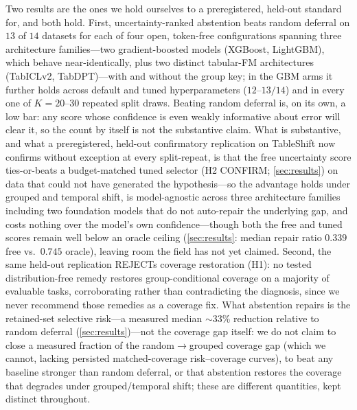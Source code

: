 \documentclass[11pt]{article}
\begin{document}
Two results are the ones we hold ourselves to a preregistered, held-out standard for, and both hold. First,
uncertainty-ranked abstention beats random deferral on $13$ of $14$ datasets for each of four open,
token-free configurations spanning three architecture families---two gradient-boosted models (XGBoost,
LightGBM), which behave near-identically, plus two distinct tabular-FM
architectures (TabICLv2, TabDPT)---with and without the group key; in the GBM arms it further holds across
default and tuned hyperparameters ($12$--$13/14$) and in every one of $K{=}20$--$30$ repeated split draws.
Beating random deferral is, on its own, a low bar: any score whose confidence is even weakly informative
about error will clear it, so the count by itself is not the substantive claim. What is substantive, and
what a preregistered, held-out confirmatory replication on TableShift now confirms without exception at
every split-repeat, is that the free uncertainty score ties-or-beats a budget-matched tuned selector (H2
CONFIRM; \cref{sec:results}) on data that could not have generated the hypothesis---so the advantage holds
under grouped and temporal shift, is model-agnostic across three architecture families including two
foundation models that do not auto-repair the underlying gap, and costs nothing over the model's own
confidence---though both the free and tuned scores remain well below an oracle ceiling (\cref{sec:results}:
median repair ratio $0.339$ free vs.\ $0.745$ oracle), leaving room the field has not yet claimed. Second,
the same held-out replication REJECTs coverage restoration (H1): no tested distribution-free remedy
restores group-conditional coverage on a majority of evaluable tasks, corroborating rather than
contradicting the diagnosis, since we never recommend those remedies as a coverage fix. What abstention
repairs is the retained-set selective risk---a measured median $\sim$33\% reduction relative to
random deferral (\cref{sec:results})---not the coverage gap itself: we do not claim to close a measured
fraction of the random$\to$grouped coverage gap (which we cannot, lacking persisted matched-coverage
risk--coverage curves), to beat any baseline stronger than random deferral, or that abstention restores the
coverage that degrades under grouped/temporal shift; these are different quantities, kept distinct
throughout.
\end{document}
